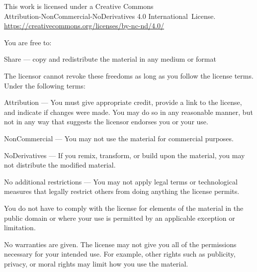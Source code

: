 \clearpage
\thispagestyle{plain}

\ifhandbookedition
\vspace*{-2\onelineskip}
\fi

{%

\ifhandbookedition
\fontsize{8.5}{10}\selectfont%
\else
\fontsize{11}{17}\selectfont%
\fi

\setlength{\parindent}{0pt}%
\raggedright\label{copyright-details}%
\setlength{\parskip}{4.5pt}%

{\centering

\ifhandbookedition
{\fontsize{12}{12}\selectfont \ccbyncnd}
\else
{\fontsize{17}{17}\selectfont \ccbyncnd}
\fi

This work is licensed under a Creative Commons\\
Attribution-NonCommercial-NoDerivatives 4.0 International~License.\\
\href{https://creativecommons.org/licenses/by-nc-nd/4.0/}{https://creativecommons.org/licenses/by-nc-nd/4.0/}

}

You are free to:

\begin{packeditemize}
\item Share — copy and redistribute the material in any medium or format
\end{packeditemize}

The licensor cannot revoke these freedoms as long as you follow the license terms. Under the following terms:

\begin{packeditemize}
\item Attribution — You must give appropriate credit, provide a link to the license, and indicate if changes were made. You may do so in any reasonable manner, but not in any way that suggests the licensor endorses you or your use.
\item NonCommercial — You may not use the material for commercial purposes.
\item NoDerivatives — If you remix, transform, or build upon the material, you may not distribute the modified material.
\end{packeditemize}

No additional restrictions — You may not apply legal terms or technological measures that legally restrict others from doing anything the license permits.

You do not have to comply with the license for elements of the material in the public domain or where your use is permitted by an applicable exception or limitation.

No warranties are given. The license may not give you all of the permissions necessary for your intended use. For example, other rights such as publicity, privacy, or moral rights may limit how you use the material.

}
